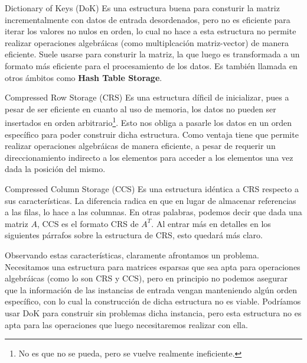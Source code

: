 \smallskip
\begin{LaTeXdescription}
    \item[Dictionary of Keys (DoK)] Es una estructura buena para consturir la
        matriz incrementalmente con datos de entrada desordenados, pero no es
        eficiente para iterar los valores no nulos en orden, lo cual no hace a
        esta estructura no permite realizar operaciones algebr\'aicas (como
        multiplcaci\'on matriz-vector) de manera eficiente. Suele usarse para
        consturir la matriz, la que luego es transformada a un formato m\'as
        eficiente para el procesamiento de los datos\cite{wiki_dok}. Es
        tambi\'en llamada en otros \'ambitos como \textbf{Hash Table
        Storage}\cite{alglib_sparse}.

    \item[Compressed Row Storage (CRS)] Es una estructura d\'ificil de
        inicializar, pues a pesar de ser eficiente en cuanto al uso de memoria,
        los datos no pueden ser insertados en orden arbitrario\footnote{No es
        que no se pueda, pero se vuelve realmente ineficiente.}. Esto nos obliga a
        pasarle los datos en un orden espec\'ifico para poder construir dicha
        estructura. Como ventaja tiene que permite realizar operaciones
        algebr\'aicas de manera eficiente, a pesar de requerir un direccionamiento
        indirecto a los elementos para acceder a los elementos una vez dada la
        posici\'on del mismo\cite{wiki_dok}\cite{alglib_sparse}.

    \item[Compressed Column Storage (CCS)] Es una estructura id\'entica a CRS
        respecto a sus caracter\'isticas. La diferencia radica en que en lugar
        de almacenar referencias a las filas, lo hace a las columnas. En otras
        palabras, podemos decir que dada una matriz $A$, CCS es el formato CRS de
        $A^T$\cite{netlib_ccs}. Al entrar m\'as en detalles en los siguientes
        p\'arrafos sobre la estructura de CRS, esto quedar\'a m\'as claro.
\end{LaTeXdescription}
\medskip

\par Observando estas caracter\'isticas, claramente afrontamos un problema.
Necesitamos una estructura para matrices esparsas que sea apta para operaciones
algebr\'aicas (como lo son CRS y CCS), pero en principio no podemos asegurar que
la informaci\'on de las instancias de entrada vengan manteniendo alg\'un orden
espec\'ifico, con lo cual la construcci\'on de dicha estructura no es viable.
Podr\'iamos usar DoK para construir sin problemas dicha instancia, pero esta
estructura no es apta para las operaciones que luego necesitaremos realizar con
ella.


